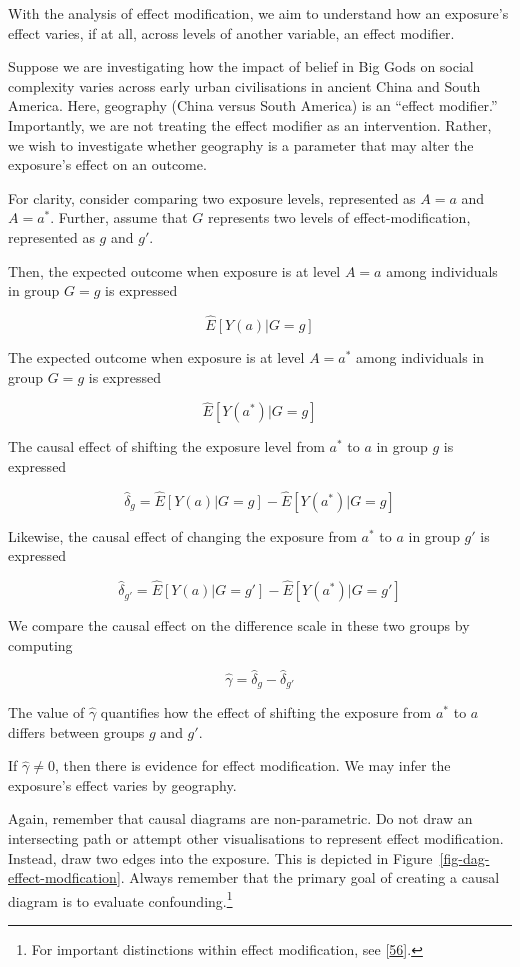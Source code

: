 \documentclass[
  singlecolumn]{article}
\begin{document}
With the analysis of effect modification, we aim to understand how an
exposure's effect varies, if at all, across levels of another variable,
an effect modifier.

Suppose we are investigating how the impact of belief in Big Gods on
social complexity varies across early urban civilisations in ancient
China and South America. Here, geography (China versus South America) is
an ``effect modifier.'' Importantly, we are not treating the effect
modifier as an intervention. Rather, we wish to investigate whether
geography is a parameter that may alter the exposure's effect on an
outcome.

For clarity, consider comparing two exposure levels, represented as
\(A = a\) and \(A= a^*\). Further, assume that \(G\) represents two
levels of effect-modification, represented as \(g\) and \(g'\).

Then, the expected outcome when exposure is at level \(A=a\) among
individuals in group \(G=g\) is expressed

\[\hat{E}[Y(a)|G=g]\]

The expected outcome when exposure is at level \(A=a^*\) among
individuals in group \(G=g\) is expressed

\[\hat{E}[Y(a^*)|G=g]\]

The causal effect of shifting the exposure level from \(a^*\) to \(a\)
in group \(g\) is expressed

\[\hat{\delta}_g = \hat{E}[Y(a)|G=g] - \hat{E}[Y(a^*)|G=g]\]

Likewise, the causal effect of changing the exposure from \(a^*\) to
\(a\) in group \(g'\) is expressed

\[\hat{\delta}_{g'} = \hat{E}[Y(a)|G=g'] - \hat{E}[Y(a^*)|G=g']\]

We compare the causal effect on the difference scale in these two groups
by computing

\[\hat{\gamma} = \hat{\delta}_g - \hat{\delta}_{g'}\]

The value of \(\hat{\gamma}\) quantifies how the effect of shifting the
exposure from \(a^*\) to \(a\) differs between groups \(g\) and \(g'\).

If \(\hat{\gamma}\neq 0\), then there is evidence for effect
modification. We may infer the exposure's effect varies by geography.

Again, remember that causal diagrams are non-parametric. Do not draw an
intersecting path or attempt other visualisations to represent effect
modification. Instead, draw two edges into the exposure. This is
depicted in Figure~\ref{fig-dag-effect-modfication}. Always remember
that the primary goal of creating a causal diagram is to evaluate
confounding.\footnote{For important distinctions within effect
  modification, see {[}\protect\hyperlink{ref-vanderweele2007}{56}{]}.}
\end{document}
